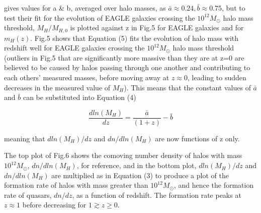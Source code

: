 \documentclass[12pt, twocolumn]{report}%
\begin{document}
\noindent gives values for a \& b, averaged over halo masses, as $\bar a \approx 0.24, \bar b \approx 0.75$, but to test their fit for the evolution of EAGLE galaxies crossing the $10^{12}M_\odot$ halo mass threshold, $M_H/M_{H,0}$ is plotted against z in Fig.5 for EAGLE galaxies and for $m_H(z)$. Fig.5 shows that Equation (5) fits the evolution of halo mass with redshift well for EAGLE galaxies crossing the $10^{12}M_\odot$ halo mass threshold (outliers in Fig.5 that are significantly more massive than they are at z=0 are believed to be caused by halos passing through one another and contributing to each others' measured masses, before moving away at $z\approx0$, leading to  sudden decreases in the measured value of $M_H$). This means that the constant values of $\bar a$ and $\bar b$ can be substituted into Equation (4)

\begin{equation}
    \frac{dln(M_H)}{dz}=\frac{\bar a}{(1+z)}-\bar b
\end{equation}

\noindent meaning that $dln(M_H)/dz$ and $dn/dln(M_H)$ are now functions of z only.\par

The top plot of Fig.6 shows the comoving number density of halos with mass $10^{12}M_\odot$, $dn/dln(M_H)$, for reference, and in the bottom plot, $dln(M_H)/dz$ and $dn/dln(M_H)$ are multiplied as in Equation (3) to produce a plot of the formation rate of halos with mass greater than $10^{12}M_\odot$, and hence the formation rate of quasars, $dn/dz$, as a function of redshift. The formation rate peaks at $z\approx1$ before decreasing for $1 \gtrsim z \geq 0$.

\onecolumngrid
\end{document}
